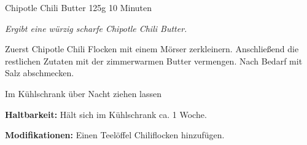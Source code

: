 \documentclass[
  DIV=11,%
  pagesize,%
  fontsize=11pt,%
  paper=a4,%
]{scrartcl}
\begin{document}
\begin{recipe}{Chipotle Chili Butter} {125g} {10 Minuten}

\freeform
\textit{Ergibt eine würzig scharfe Chipotle Chili Butter.}


Zuerst Chipotle Chili Flocken mit einem Mörser zerkleinern.
Anschließend die restlichen Zutaten mit der zimmerwarmen Butter vermengen.
Nach Bedarf mit Salz abschmecken.

\newstep
Im Kühlschrank über Nacht ziehen lassen

\freeform
\hrulefill

\freeform 
\textbf{Haltbarkeit:}
Hält sich im Kühlschrank ca. 1 Woche.

\freeform 
\textbf{Modifikationen:}
Einen Teelöffel Chiliflocken hinzufügen.

\end{recipe}
\end{document}
